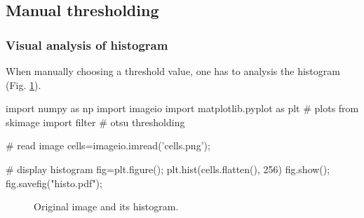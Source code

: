 \def\QRCODE{TB_image_TUT.IMG.image_segmentation_histogram_clustering_pythonqrcode.png}
\def\QRPAGE{http://www.iptutorials.science/tree/master/TB_image/TUT.IMG.image_segmentation_histogram_clustering/python}

\subsection{Manual thresholding}
\subsubsection{Visual analysis of histogram}
When manually choosing a threshold value, one has to analysis the histogram (Fig. \ref{fig:histoseg:python:autothresh}).

\begin{python}
import numpy as np
import imageio
import matplotlib.pyplot as plt # plots
from skimage import filter # otsu thresholding

# read image
cells=imageio.imread('cells.png');

# display histogram
fig=plt.figure();
plt.hist(cells.flatten(), 256)
fig.show();
fig.savefig("histo.pdf");
\end{python}

\begin{figure}[htbp]
\centering\caption{Original image and its histogram.}
\hfill
{}
 \label{fig:histoseg:python:autothresh}
\end{figure}

